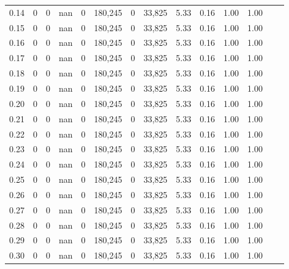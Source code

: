 \begin{tabular}{rrrrrrrrrrrrrr}
0.14 &        0 &       0 &     nan &        0 &  180,245 &       0 &  33,825 &  5.33 &  0.16 &  1.00 &      1.00 \\
0.15 &        0 &       0 &     nan &        0 &  180,245 &       0 &  33,825 &  5.33 &  0.16 &  1.00 &      1.00 \\
0.16 &        0 &       0 &     nan &        0 &  180,245 &       0 &  33,825 &  5.33 &  0.16 &  1.00 &      1.00 \\
0.17 &        0 &       0 &     nan &        0 &  180,245 &       0 &  33,825 &  5.33 &  0.16 &  1.00 &      1.00 \\
0.18 &        0 &       0 &     nan &        0 &  180,245 &       0 &  33,825 &  5.33 &  0.16 &  1.00 &      1.00 \\
0.19 &        0 &       0 &     nan &        0 &  180,245 &       0 &  33,825 &  5.33 &  0.16 &  1.00 &      1.00 \\
0.20 &        0 &       0 &     nan &        0 &  180,245 &       0 &  33,825 &  5.33 &  0.16 &  1.00 &      1.00 \\
0.21 &        0 &       0 &     nan &        0 &  180,245 &       0 &  33,825 &  5.33 &  0.16 &  1.00 &      1.00 \\
0.22 &        0 &       0 &     nan &        0 &  180,245 &       0 &  33,825 &  5.33 &  0.16 &  1.00 &      1.00 \\
0.23 &        0 &       0 &     nan &        0 &  180,245 &       0 &  33,825 &  5.33 &  0.16 &  1.00 &      1.00 \\
0.24 &        0 &       0 &     nan &        0 &  180,245 &       0 &  33,825 &  5.33 &  0.16 &  1.00 &      1.00 \\
0.25 &        0 &       0 &     nan &        0 &  180,245 &       0 &  33,825 &  5.33 &  0.16 &  1.00 &      1.00 \\
0.26 &        0 &       0 &     nan &        0 &  180,245 &       0 &  33,825 &  5.33 &  0.16 &  1.00 &      1.00 \\
0.27 &        0 &       0 &     nan &        0 &  180,245 &       0 &  33,825 &  5.33 &  0.16 &  1.00 &      1.00 \\
0.28 &        0 &       0 &     nan &        0 &  180,245 &       0 &  33,825 &  5.33 &  0.16 &  1.00 &      1.00 \\
0.29 &        0 &       0 &     nan &        0 &  180,245 &       0 &  33,825 &  5.33 &  0.16 &  1.00 &      1.00 \\
0.30 &        0 &       0 &     nan &        0 &  180,245 &       0 &  33,825 &  5.33 &  0.16 &  1.00 &      1.00 \\

\end{tabular}
